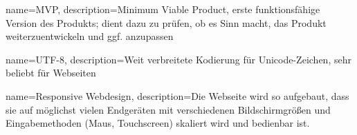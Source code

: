 
{
    name=MVP,
    description={Minimum Viable Product, erste funktionsfähige Version des Produkts; dient dazu zu prüfen, ob es Sinn macht, das Produkt weiterzuentwickeln und ggf. anzupassen}
}


{
    name=UTF-8,
    description={Weit verbreitete Kodierung für Unicode-Zeichen, sehr beliebt für Webseiten}
}

{
    name=Responsive Webdesign,
    description={Die Webseite wird so aufgebaut, dass sie auf möglichst vielen Endgeräten mit verschiedenen Bildschirmgrößen und Eingabemethoden (Maus, Touchscreen) skaliert wird und bedienbar ist.}
}

